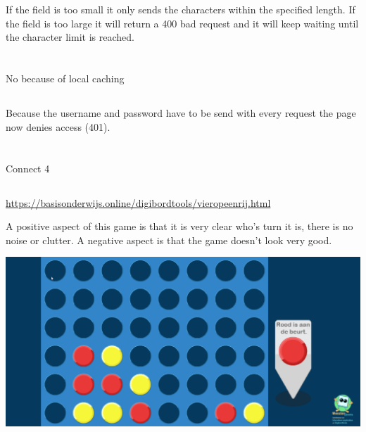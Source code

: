 \documentclass{article}
\begin{document}
     \section{}
     \subsection{}

     If the field is too small it only sends the characters within the specified length.
     If the field is too large it will return a 400 bad request and it will keep waiting until the character limit is reached.

     \section{}
     \subsection{}

     No because of local caching

     \subsection{}

     Because the username and password have to be send with every request the page now denies access (401).

     \section{}
     \subsection{}
     Connect 4

     \subsection{}
     \url{https://basisonderwijs.online/digibordtools/vieropeenrij.html}

     A positive aspect of this game is that it is very clear who's turn it is, there is no noise or clutter. A negative aspect is that the game doesn't look very good.

     \includegraphics[width=\linewidth]{3}
\end{document}
